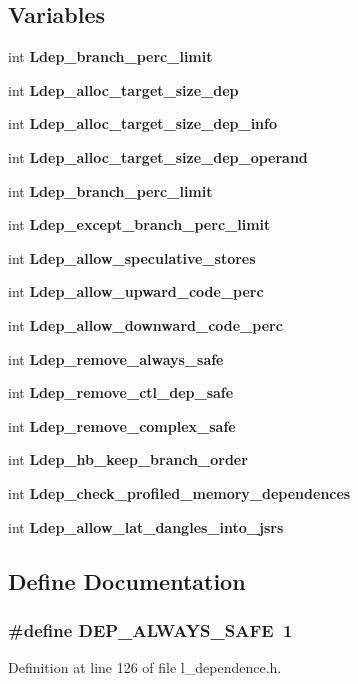 \subsection*{Variables}
\begin{CompactItemize}
\item 
int \bf{Ldep\_\-branch\_\-perc\_\-limit}
\item 
int \bf{Ldep\_\-alloc\_\-target\_\-size\_\-dep}
\item 
int \bf{Ldep\_\-alloc\_\-target\_\-size\_\-dep\_\-info}
\item 
int \bf{Ldep\_\-alloc\_\-target\_\-size\_\-dep\_\-operand}
\item 
int \bf{Ldep\_\-branch\_\-perc\_\-limit}
\item 
int \bf{Ldep\_\-except\_\-branch\_\-perc\_\-limit}
\item 
int \bf{Ldep\_\-allow\_\-speculative\_\-stores}
\item 
int \bf{Ldep\_\-allow\_\-upward\_\-code\_\-perc}
\item 
int \bf{Ldep\_\-allow\_\-downward\_\-code\_\-perc}
\item 
int \bf{Ldep\_\-remove\_\-always\_\-safe}
\item 
int \bf{Ldep\_\-remove\_\-ctl\_\-dep\_\-safe}
\item 
int \bf{Ldep\_\-remove\_\-complex\_\-safe}
\item 
int \bf{Ldep\_\-hb\_\-keep\_\-branch\_\-order}
\item 
int \bf{Ldep\_\-check\_\-profiled\_\-memory\_\-dependences}
\item 
int \bf{Ldep\_\-allow\_\-lat\_\-dangles\_\-into\_\-jsrs}
\end{CompactItemize}


\subsection{Define Documentation}
\subsubsection{\setlength{\rightskip}{0pt plus 5cm}\#define DEP\_\-ALWAYS\_\-SAFE~1}\label{l__dependence_8h_09c92343f8bd5f2604389a19fde17cf9}




Definition at line 126 of file l\_\-dependence.h.

